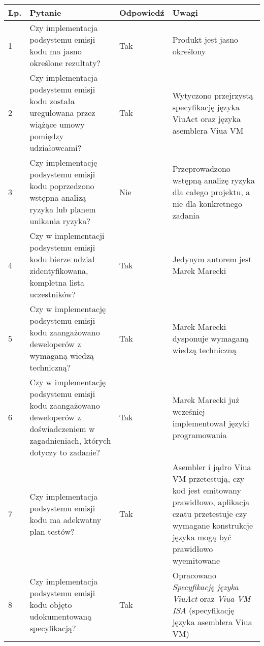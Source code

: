 \documentclass[11pt,oneside,a4paper,titlepage,onecolumn]{article}
\begin{document}
\begin{tabularx}{\textwidth}{|l|X|l|X|}
	\hline

	\hline
    Lp. & Pytanie & Odpowiedź & Uwagi \\ \hline
    
    1 
    & Czy implementacja podsystemu emisji kodu ma jasno określone 
    rezultaty?
    & Tak
    & Produkt jest jasno określony
    \\\hline

    2
	& Czy implementacja podsystemu emisji kodu została uregulowana
	przez wiążące umowy pomiędzy udziałowcami?
	& Tak
	& Wytyczono przejrzystą specyfikację języka ViuAct oraz języka
	asemblera Viua VM
	\\\hline	
	
	3
	& Czy implementację podsystemu emisji kodu poprzedzono wstępna
	analizą	ryzyka lub planem unikania ryzyka?
	& Nie
	& Przeprowadzono wstępną analizę ryzyka dla całego projektu, a
	nie dla konkretnego zadania
	\\\hline
	
	4
	& Czy w implementacji podsystemu emisji kodu bierze udział 
	zidentyfikowana, kompletna lista uczestników?
	& Tak
	& Jedynym autorem jest Marek Marecki
	\\\hline

	5
	& Czy w implementację podsystemu emisji kodu zaangażowano
	deweloperów z wymaganą wiedzą techniczną?
	& Tak
	& Marek Marecki dysponuje wymaganą wiedzą techniczną
	\\\hline
	
	6
	& Czy w implementację podsystemu emisji kodu zaangażowano
	deweloperów z doświadczeniem w zagadnieniach, których dotyczy 
	to zadanie?
	& Tak
	& Marek Marecki już wcześniej implementował języki programowania
	\\\hline

	7
	& Czy implementacja podsystemu emisji kodu ma adekwatny plan
	testów?
	& Tak
	& Asembler i jądro Viua VM przetestują, czy kod jest emitowany
	prawidłowo, aplikacja czatu przetestuje czy wymagane konstrukcje
	języka mogą być prawidłowo wyemitowane
	\\\hline	
	
	8
	& Czy implementacja podsystemu emisji kodu objęto udokumentowaną
	specyfikacją?
	& Tak
	& Opracowano \textit{Specyfikację języka ViuAct} oraz 
	\textit{Viua VM ISA} (specyfikację języka asemblera Viua VM)
	\\\hline
\end{tabularx}
	
\end{document}
